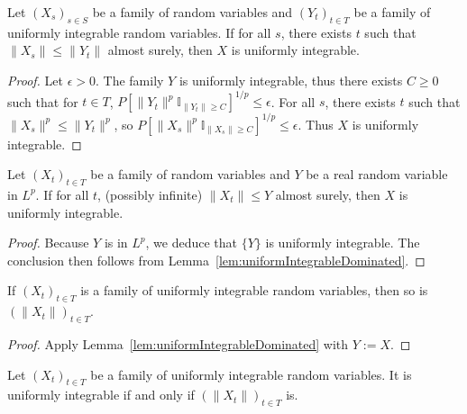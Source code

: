 \begin{lemma}\label{lem:uniformIntegrableDominated}
  \leanok
Let $(X_s)_{s \in S}$ be a family of random variables and $(Y_t)_{t \in T}$ be a family of uniformly integrable random variables. If for all $s$, there exists $t$ such that $\|X_s\| \le \|Y_t\|$ almost surely, then $X$ is uniformly integrable.
\end{lemma}

\begin{proof}
Let $\epsilon > 0$. The family $Y$ is uniformly integrable, thus there exists $C \ge 0$ such that for $t \in T$, $P[\|Y_t\|^p \mathbb{I}_{\|Y_t\| \ge C}]^{1/p} \le \epsilon$. For all $s$, there exists $t$ such that $\|X_s\|^p \le \|Y_t\|^p$, so $P[\|X_s\|^p \mathbb{I}_{\|X_s\| \ge C}]^{1/p} \le \epsilon$. Thus $X$ is uniformly integrable.
\end{proof}


\begin{lemma}\label{lem:uniformIntegrableDominatedSingleton}
  \leanok
Let $(X_t)_{t \in T}$ be a family of random variables and $Y$ be a real random variable in $L^p$. If for all $t$, (possibly infinite) $\|X_t\| \le Y$ almost surely, then $X$ is uniformly integrable.
\end{lemma}

\begin{proof}
Because $Y$ is in $L^p$, we deduce that $\{Y\}$ is uniformly integrable. The conclusion then follows from Lemma~\ref{lem:uniformIntegrableDominated}.
\end{proof}

\begin{lemma}\label{lem:uniformIntegrableNorm}
  \leanok
If $(X_t)_{t \in T}$ is a family of uniformly integrable random variables, then so is $(\|X_t\|)_{t \in T}$.
\end{lemma}

\begin{proof}
  \leanok
Apply Lemma~\ref{lem:uniformIntegrableDominated} with $Y := X$.
\end{proof}

\begin{lemma}\label{lem:uniformIntegrableIffNorm}
  \leanok
Let $(X_t)_{t \in T}$ be a family of uniformly integrable random variables. It is uniformly integrable if and only if $(\|X_t\|)_{t \in T}$ is.
\end{lemma}

